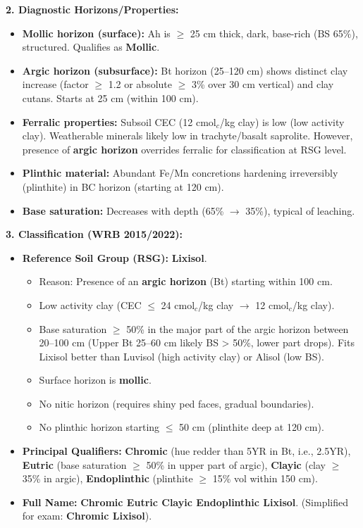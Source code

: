 \documentclass[11pt]{article}
\begin{document}
\begin{exoresolu}
\noindent\textbf{2. Diagnostic Horizons/Properties:}
\begin{itemize}
\item \textbf{Mollic horizon (surface):} Ah is $\ge$ 25 cm thick, dark, base-rich (BS 65\%), structured. Qualifies as \textbf{Mollic}.
\item \textbf{Argic horizon (subsurface):} Bt horizon (25--120 cm) shows distinct clay increase (factor $\ge$ 1.2 or absolute $\ge$ 3\% over 30 cm vertical) and clay cutans. Starts at 25 cm (within 100 cm).
\item \textbf{Ferralic properties:} Subsoil CEC (12 cmol$_c$/kg clay) is low (low activity clay). Weatherable minerals likely low in trachyte/basalt saprolite. However, presence of \textbf{argic horizon} overrides ferralic for classification at RSG level.
\item \textbf{Plinthic material:} Abundant Fe/Mn concretions hardening irreversibly (plinthite) in BC horizon (starting at 120 cm).
\item \textbf{Base saturation:} Decreases with depth (65\% $\rightarrow$ 35\%), typical of leaching.
\end{itemize}

\noindent\textbf{3. Classification (WRB 2015/2022):}
\begin{itemize}
\item \textbf{Reference Soil Group (RSG):} \textbf{Lixisol}. 
      \begin{itemize}
      \item Reason: Presence of an \textbf{argic horizon} (Bt) starting within 100 cm.
      \item Low activity clay (CEC $\le$ 24 cmol$_c$/kg clay $\rightarrow$ 12 cmol$_c$/kg clay).
      \item Base saturation $\ge$ 50\% in the major part of the argic horizon between 20--100 cm (Upper Bt 25--60 cm likely BS > 50\%, lower part drops). Fits Lixisol better than Luvisol (high activity clay) or Alisol (low BS).
      \item Surface horizon is \textbf{mollic}.
      \item No nitic horizon (requires shiny ped faces, gradual boundaries).
      \item No plinthic horizon starting $\le$ 50 cm (plinthite deep at 120 cm).
      \end{itemize}
\item \textbf{Principal Qualifiers:} \textbf{Chromic} (hue redder than 5YR in Bt, i.e., 2.5YR), \textbf{Eutric} (base saturation $\ge$ 50\% in upper part of argic), \textbf{Clayic} (clay $\ge$ 35\% in argic), \textbf{Endoplinthic} (plinthite $\ge$ 15\% vol within 150 cm).
\item \textbf{Full Name:} \textbf{Chromic Eutric Clayic Endoplinthic Lixisol}. (Simplified for exam: \textbf{Chromic Lixisol}).
\end{itemize}


\end{exoresolu}
\end{document}
